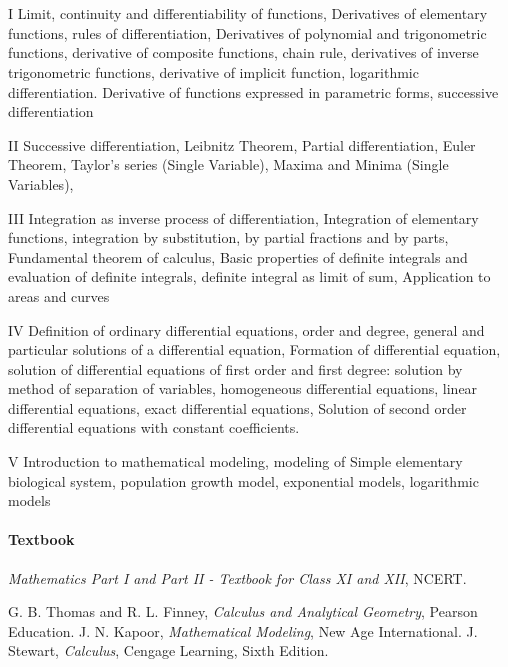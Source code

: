 \section{\courseinfo}

\unit{I}
Limit, continuity and differentiability of functions, Derivatives of elementary functions, rules of differentiation, Derivatives of polynomial and trigonometric functions, derivative of composite functions, chain rule, derivatives of inverse trigonometric functions, derivative of implicit function, logarithmic differentiation. Derivative of functions expressed in parametric forms, successive differentiation

\unit{II} 
Successive differentiation, Leibnitz Theorem, Partial differentiation, Euler Theorem, Taylor’s series (Single Variable), Maxima and Minima (Single Variables),
 
\unit{III}
 Integration as inverse process of differentiation, Integration of elementary functions, integration by substitution, by partial fractions and by parts, Fundamental theorem of calculus, Basic properties of definite integrals and evaluation of definite integrals, definite integral as limit of sum, Application to areas and curves
 
\unit{IV}
 Definition of ordinary differential equations, order and degree, general and particular solutions of a differential equation, Formation of differential equation, solution of differential equations of first order and first degree: solution by method of separation of variables, homogeneous differential equations, linear differential equations, exact differential equations, Solution of second order differential equations with constant coefficients.
 
\unit{V}
 Introduction to mathematical modeling, modeling of Simple elementary biological system, population growth model, exponential models, logarithmic models
 

\paragraph{Textbook}
\emph{Mathematics Part I and Part II - Textbook for Class XI and XII}, NCERT.

\begin{thebibliography}{}
\let\clearpage\relax
{} G. B. Thomas and R. L. Finney, \emph{Calculus and Analytical Geometry}, Pearson Education.
 J. N. Kapoor, \emph{Mathematical Modeling}, New Age International.
 J. Stewart, \emph{Calculus}, Cengage Learning, Sixth Edition.
\end{thebibliography}














